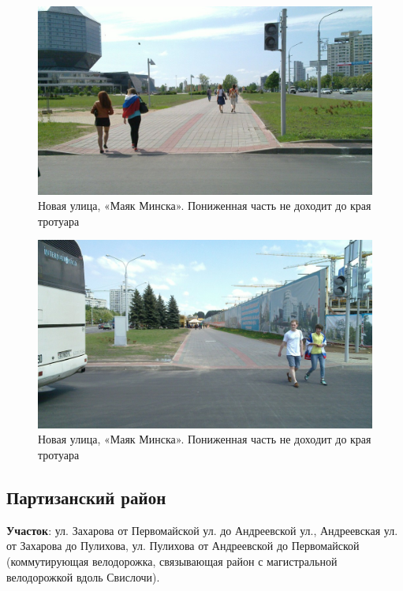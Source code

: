\documentclass[a4paper,14pt,twoside]{extarticle}
\renewcommand\emph[1]{\textbf{#1}}
\begin{document}
\begin{figure}[h!]
    \centering
    \includegraphics[width=\textwidth]{Pictures/1000000000000A00000005A02D5A121F.jpg}
    \caption{Новая улица, «Маяк Минска». Пониженная часть не доходит до края тротуара}
\end{figure}

\begin{figure}[h!]
    \centering
    \includegraphics[width=\textwidth]{Pictures/1000000000000A00000005A0644D364B.jpg}
    \caption{Новая улица, «Маяк Минска». Пониженная часть не доходит до края тротуара}
\end{figure}

\clearpage
\newpage

\subsection*{Партизанский район}
\emph{Участок}: ул. Захарова от Первомайской ул. до Андреевской ул., Андреевская ул. от Захарова до Пулихова, ул. Пулихова от Андреевской до Первомайской (коммутирующая велодорожка, связывающая район с магистральной велодорожкой вдоль Свислочи).
\end{document}

